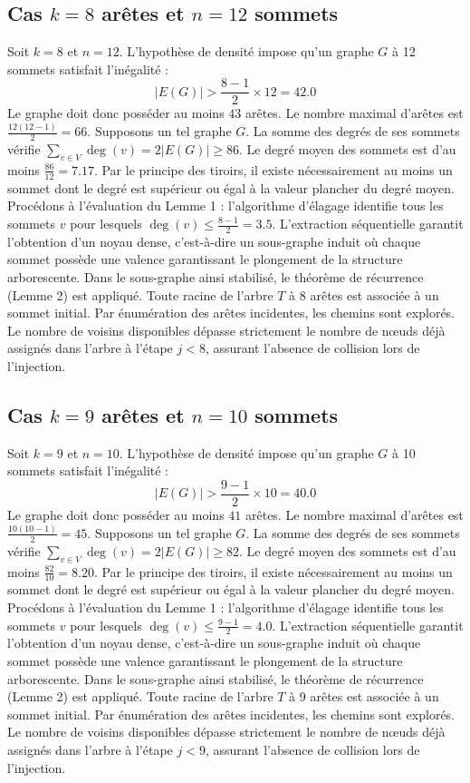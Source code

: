 \documentclass[12pt,a4paper]{article}
\begin{document}
\subsection{Cas $k = 8$ arêtes et $n = 12$ sommets}
Soit $k = 8$ et $n = 12$. L'hypothèse de densité impose qu'un graphe $G$ à 12 sommets satisfait l'inégalité :
$$ |E(G)| > \frac{8-1}{2} \times 12 = 42.0 $$
Le graphe doit donc posséder au moins $43$ arêtes. Le nombre maximal d'arêtes est $\frac{12(12-1)}{2} = 66$.
Supposons un tel graphe $G$. La somme des degrés de ses sommets vérifie $\sum_{v \in V} \deg(v) = 2|E(G)| \geq 86$.
Le degré moyen des sommets est d'au moins $\frac{86}{12} = 7.17$.
Par le principe des tiroirs, il existe nécessairement au moins un sommet dont le degré est supérieur ou égal à la valeur plancher du degré moyen.
Procédons à l'évaluation du Lemme 1 : l'algorithme d'élagage identifie tous les sommets $v$ pour lesquels $\deg(v) \leq \frac{8-1}{2} = 3.5$.
L'extraction séquentielle garantit l'obtention d'un noyau dense, c'est-à-dire un sous-graphe induit où chaque sommet possède une valence garantissant le plongement de la structure arborescente.
Dans le sous-graphe ainsi stabilisé, le théorème de récurrence (Lemme 2) est appliqué. Toute racine de l'arbre $T$ à 8 arêtes est associée à un sommet initial. Par énumération des arêtes incidentes, les chemins sont explorés. Le nombre de voisins disponibles dépasse strictement le nombre de nœuds déjà assignés dans l'arbre à l'étape $j < 8$, assurant l'absence de collision lors de l'injection.

\subsection{Cas $k = 9$ arêtes et $n = 10$ sommets}
Soit $k = 9$ et $n = 10$. L'hypothèse de densité impose qu'un graphe $G$ à 10 sommets satisfait l'inégalité :
$$ |E(G)| > \frac{9-1}{2} \times 10 = 40.0 $$
Le graphe doit donc posséder au moins $41$ arêtes. Le nombre maximal d'arêtes est $\frac{10(10-1)}{2} = 45$.
Supposons un tel graphe $G$. La somme des degrés de ses sommets vérifie $\sum_{v \in V} \deg(v) = 2|E(G)| \geq 82$.
Le degré moyen des sommets est d'au moins $\frac{82}{10} = 8.20$.
Par le principe des tiroirs, il existe nécessairement au moins un sommet dont le degré est supérieur ou égal à la valeur plancher du degré moyen.
Procédons à l'évaluation du Lemme 1 : l'algorithme d'élagage identifie tous les sommets $v$ pour lesquels $\deg(v) \leq \frac{9-1}{2} = 4.0$.
L'extraction séquentielle garantit l'obtention d'un noyau dense, c'est-à-dire un sous-graphe induit où chaque sommet possède une valence garantissant le plongement de la structure arborescente.
Dans le sous-graphe ainsi stabilisé, le théorème de récurrence (Lemme 2) est appliqué. Toute racine de l'arbre $T$ à 9 arêtes est associée à un sommet initial. Par énumération des arêtes incidentes, les chemins sont explorés. Le nombre de voisins disponibles dépasse strictement le nombre de nœuds déjà assignés dans l'arbre à l'étape $j < 9$, assurant l'absence de collision lors de l'injection.
\end{document}
